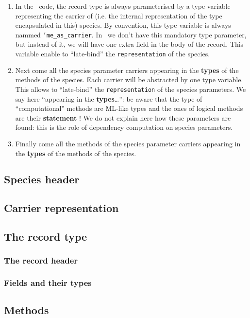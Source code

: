 \begin{enumerate}
\item In the \ocaml\ code, the record type is always parameterised by
  a type variable representing the carrier of (i.e. the internal
  representation of the type encapsulated in this) species. By
  convention, this type variable is always nammed {\tt 'me\_as\_carrier}.
  In \coq\ we don't have this mandatory type parameter, but instead of
  it, we will have one extra field in the body of the record. This
  variable enable to ``late-bind'' the {\tt representation} of the
  species.

\item Next come all the species parameter carriers appearing in the
  {\bf types} of the methods of the species. Each carrier will be
  abstracted by one type variable. This allows to ``late-bind'' the
  {\tt representation} of the species parameters. We say here 
  ``appearing in the {\bf types}\ldots'': be aware that the type of
  ``computational'' methods are ML-like types and the ones of logical
  methods are their {\bf statement} ! We do not explain here how these
  parameters are found: this is the role of dependency computation on
  species parameters.

\item Finally come all the methods of the species parameter carriers
  appearing in the {\bf types} of the methods of the species.
\end{enumerate}

\subsection{Species header}
\subsection{Carrier representation}
\subsection{The record type}
\subsubsection{The record header}
\subsubsection{Fields and their types}
\subsection{Methods}
